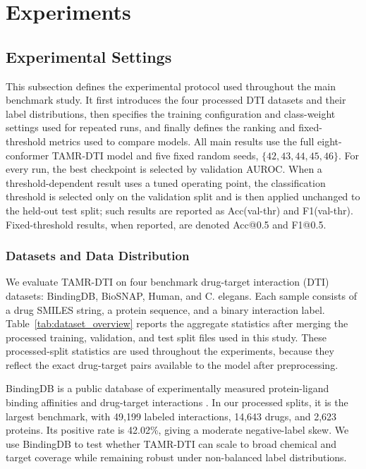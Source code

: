 \section{Experiments}
\label{sec:experiments}

\subsection{Experimental Settings}

This subsection defines the experimental protocol used throughout the main benchmark study. It first introduces the four processed DTI datasets and their label distributions, then specifies the training configuration and class-weight settings used for repeated runs, and finally defines the ranking and fixed-threshold metrics used to compare models. All main results use the full eight-conformer TAMR-DTI model and five fixed random seeds, $\{42,43,44,45,46\}$. For every run, the best checkpoint is selected by validation AUROC. When a threshold-dependent result uses a tuned operating point, the classification threshold is selected only on the validation split and is then applied unchanged to the held-out test split; such results are reported as Acc(val-thr) and F1(val-thr). Fixed-threshold results, when reported, are denoted Acc@0.5 and F1@0.5.

\subsubsection{Datasets and Data Distribution}

We evaluate TAMR-DTI on four benchmark drug-target interaction (DTI) datasets: BindingDB, BioSNAP, Human, and C. elegans. Each sample consists of a drug SMILES string, a protein sequence, and a binary interaction label. Table~\ref{tab:dataset_overview} reports the aggregate statistics after merging the processed training, validation, and test split files used in this study. These processed-split statistics are used throughout the experiments, because they reflect the exact drug-target pairs available to the model after preprocessing.

BindingDB is a public database of experimentally measured protein-ligand binding affinities and drug-target interactions \citep{liu2007bindingdb}. In our processed splits, it is the largest benchmark, with 49,199 labeled interactions, 14,643 drugs, and 2,623 proteins. Its positive rate is 42.02\%, giving a moderate negative-label skew. We use BindingDB to test whether TAMR-DTI can scale to broad chemical and target coverage while remaining robust under non-balanced label distributions.

